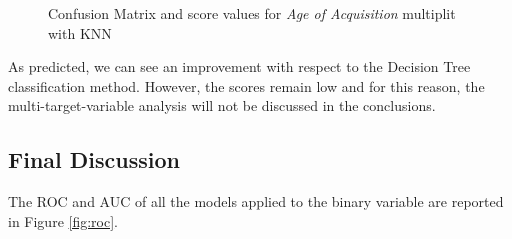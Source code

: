 \documentclass[a4paper,11pt,dvipsnames]{article}
\begin{document}
\begin{figure}[h]
\begin{minipage}{.2\linewidth}
  \end{minipage}
  
  \caption{Confusion Matrix and score values for \textit{Age of Acquisition} multiplit with KNN} \label{aoa_multi_KNN}
\end{figure}

As predicted, we can see an improvement with respect to the Decision Tree classification method. However, the scores remain low and for this reason, the multi-target-variable analysis will not be discussed in the conclusions.

\subsection{Final Discussion}
The ROC and AUC of all the models applied to the binary variable are reported in Figure \ref{fig:roc}.
\end{document}
